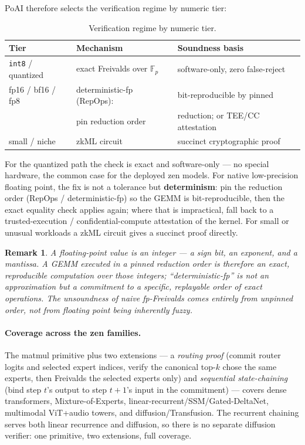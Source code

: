 \documentclass[11pt]{article}
\newtheorem{remark}{Remark}
\newcommand{\Fp}{\ensuremath{\mathbb{F}_p}}
\newcommand{\code}[1]{\texttt{#1}}
\begin{document}
PoAI therefore selects the verification regime by numeric tier:

\begin{table}[H]
\centering
\caption{Verification regime by numeric tier.}
\label{tab:fp-tiers}
\begin{tabular}{lll}
\toprule
\textbf{Tier} & \textbf{Mechanism} & \textbf{Soundness basis} \\
\midrule
\code{int8} / quantized & exact Freivalds over $\Fp$ & software-only, zero false-reject \\
fp16 / bf16 / fp8       & deterministic-fp (RepOps): & bit-reproducible by pinned \\
                        & pin reduction order        & reduction; or TEE/CC attestation \\
small / niche           & zkML circuit               & succinct cryptographic proof \\
\bottomrule
\end{tabular}
\end{table}

For the quantized path the check is exact and software-only --- no special
hardware, the common case for the deployed zen models. For native low-precision
floating point, the fix is not a tolerance but \textbf{determinism}: pin the
reduction order (RepOps / deterministic-fp) so the GEMM is bit-reproducible, then
the exact equality check applies again; where that is impractical, fall back to a
trusted-execution / confidential-compute attestation of the kernel. For small or
unusual workloads a zkML circuit gives a succinct proof directly.

\begin{remark}
A floating-point value \emph{is} an integer --- a sign bit, an exponent, and a
mantissa. A GEMM executed in a \emph{pinned} reduction order is therefore an
exact, reproducible computation over those integers; ``deterministic-fp'' is not
an approximation but a commitment to a specific, replayable order of exact
operations. The unsoundness of naive fp-Freivalds comes entirely from
\emph{unpinned} order, not from floating point being inherently fuzzy.
\end{remark}

\paragraph{Coverage across the zen families.} The matmul primitive plus two
extensions --- a \emph{routing proof} (commit router logits and selected expert
indices, verify the canonical top-$k$ chose the same experts, then Freivalds the
selected experts only) and \emph{sequential state-chaining} (bind step $t$'s
output to step $t{+}1$'s input in the commitment) --- covers dense transformers,
Mixture-of-Experts, linear-recurrent/SSM/Gated-DeltaNet, multimodal ViT+audio
towers, and diffusion/Transfusion. The recurrent chaining serves both linear
recurrence and diffusion, so there is no separate diffusion verifier: one
primitive, two extensions, full coverage.
\end{document}
